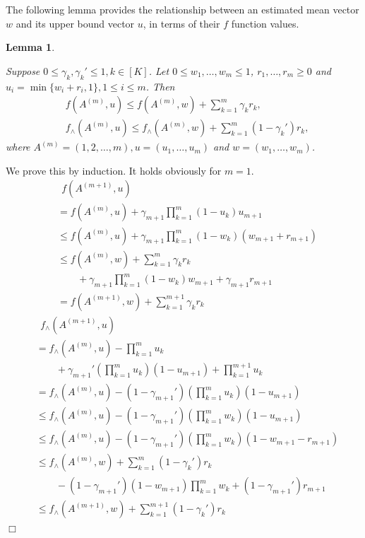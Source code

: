 \documentclass{article}
\newtheorem{lemma}[theorem]{Lemma}%
\newenvironment{proof}{\noindent {\textbf{Proof. }}}{$\Box$ \medskip}
\newcommand{\CLemmaTech}{
  Suppose $0 \leq \gamma_k, \gamma_k' \leq 1, k \in [K]$. Let $0 \leq w_1, \ldots, w_m \leq 1$, $r_1, \ldots, r_m \geq 0$ and $u_i = \min\{w_i + r_i, 1\}, 1 \leq i \leq m$. Then
  \begin{align*}
    &f(A^{(m)}, u) \leq f(A^{(m)}, w) + \sum_{k=1}^{m} \gamma_k r_k,\\
    &f_{\wedge}(A^{(m)}, u) \leq f_{\wedge}(A^{(m)}, w) + \sum_{k=1}^{m} (1 - \gamma_k') r_k,
  \end{align*}
  where $A^{(m)} = (1, 2, \ldots, m), u = (u_1, \ldots, u_m)$ and $w = (w_1, \ldots, w_m)$.
}
\begin{document}
The following lemma provides the relationship between an estimated mean vector $w$ and its upper bound vector $u$, in terms of their $f$ function values.
\begin{lemma} %
  \label{lem:estimateTech}
  \CLemmaTech
\end{lemma}
\begin{proof}
  We prove this by induction. It holds obviously for $m = 1$.
  \begin{align*}
  	&~~f(A^{(m+1)}, u)\\
  	&= f(A^{(m)}, u) + \gamma_{m+1}\prod_{k=1}^m(1 - u_k) u_{m+1}\\
  	&\leq f(A^{(m)}, u) +  \gamma_{m+1} \prod_{k=1}^m(1 - w_k) (w_{m+1} + r_{m+1})\\
  	&\leq f(A^{(m)}, w) + \sum_{k=1}^m \gamma_k r_k \\
  	&\qquad + \gamma_{m+1} \prod_{k=1}^m(1 - w_k) w_{m+1} + \gamma_{m+1} r_{m+1}\\
  	&= f(A^{(m+1)}, w) + \sum_{k=1}^{m+1} \gamma_k r_k
  \end{align*}
  \begin{align*}
  	&~~f_{\wedge}(A^{(m+1)}, u) \\
  	&= f_{\wedge}(A^{(m)}, u) -\prod_{k=1}^{m} u_k \\
  	&\qquad+ \gamma_{m+1}' (\prod_{k=1}^{m} u_k) (1 - u_{m+1})+ \prod_{k=1}^{m+1} u_k\\
  	&= f_{\wedge}(A^{(m)}, u) - (1 - \gamma_{m+1}') (\prod_{k=1}^{m} u_k) (1 - u_{m+1})\\
  	&\leq f_{\wedge}(A^{(m)}, u) - (1 - \gamma_{m+1}') (\prod_{k=1}^{m} w_k) (1 - u_{m+1})\\
  	&\leq f_{\wedge}(A^{(m)}, u) -(1 - \gamma_{m+1}') (\prod_{k=1}^{m} w_k)  (1 - w_{m+1} - r_{m+1})\\
  	&\leq f_{\wedge}(A^{(m)}, w) +  \sum_{k=1}^{m} (1 - \gamma_k') r_k \\
  	&\qquad - (1 - \gamma_{m+1}') (1 - w_{m+1}) \prod_{k=1}^{m} w_k + (1 - \gamma_{m+1}') r_{m+1}\\
  	&\leq f_{\wedge}(A^{(m+1)}, w) + \sum_{k=1}^{m+1} (1 - \gamma_k') r_k
  \end{align*}
\end{proof}
\end{document}
